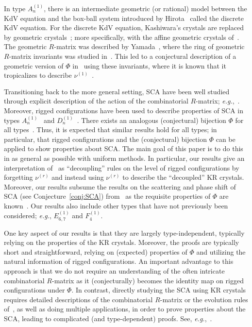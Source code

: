 \documentclass[reqno]{amsart}
\theoremstyle{plain}
\theoremstyle{definition}
\numberwithin{equation}{section}
\begin{document}
In type $A_n^{(1)}$, there is an intermediate geometric (or rational) model between the KdV equation and the box-ball system introduced by Hirota~\cite{Hirota81} called the discrete KdV equation.
For the discrete KdV equation, Kashiwara's crystals are replaced by geometric crystals~\cite{BK00, BK07}; more specifically, with the affine geometric crystals of~\cite{KNO08,LP12}.
The geometric $R$-matrix was described by Yamada~\cite{Yamada01}, where the ring of geometric $R$-matrix invariants was studied in~\cite{LP13}.
This led to a conjectural description of a geometric version of $\Phi$ in~\cite{LPS15, Scrimshaw17II} using these invariants, where it is known that it tropicalizes to describe $\nu^{(1)}$~\cite{LPS15}.

Transitioning back to the more general setting, SCA have been well studied through explicit description of the action of the combinatorial $R$-matrix; \textit{e.g.},~\cite{binMohamad12,FOY00,HHIKTT01,HKOTY02,HKT00,MOW12,MW13,TNS96,Yamada04,Yamada07}.
Moreover, rigged configurations have been used to describe properties of SCA in types $A_n^{(1)}$~\cite{KOSTY06,KSY07,Sakamoto08} and $D_n^{(1)}$~\cite{KSY11,Sakamoto17}.
There exists an analogous (conjectural) bijection $\Phi$ for all types~\cite{DS06, JS10, KSS02, OSSS16, OS12, OSS17, OSS03, OSS03III, OSS03II, SchillingS15, SS2006, SW10, Scrimshaw15, Scrimshaw17}.
Thus, it is expected that similar results hold for all types; in particular, that rigged configurations and the (conjectural) bijection $\Phi$ can be applied to show properties about SCA.
The main goal of this paper is to do this in as general as possible with uniform methods.
In particular, our results give an interpretation of~\cite[App.~B]{HKOTT02} as ``decoupling'' rules on the level of rigged configurations by forgetting $\nu^{(r)}$ and instead using $\nu^{(r)}$ to describe the ``decoupled'' KR crystals.
Moreover, our results subsume the results on the scattering and phase shift of SCA (see Conjecture~\ref{conj:SCA}) from~\cite{binMohamad12,FOY00,HHIKTT01,HKOTY02,HKT00,MOW12,MW13,TNS96,Yamada04,Yamada07} as the requisite properties of $\Phi$ are known~\cite{KSS02,OSSS16,OSS17,Scrimshaw17}.
Our results also include other types that have not previously been considered; \textit{e.g.}, $E_{6,7}^{(1)}$ and $F_4^{(1)}$.

One key aspect of our results is that they are largely type-independent, typically relying on the properties of the KR crystals.
Moreover, the proofs are typically short and straightforward, relying on (expected) properties of $\Phi$ and utilizing the natural information of rigged configurations.
An important advantage to this approach is that we do not require an understanding of the often intricate combinatorial $R$-matrix as it (conjecturally) becomes the identity map on rigged configurations under $\Phi$.
In contrast, directly studying the SCA using KR crystals requires detailed descriptions of the combinatorial $R$-matrix or the evolution rules of~\cite{HKT:2001}, as well as doing multiple applications, in order to prove properties about the SCA, leading to complicated (and type-dependent) proofs.
See, \textit{e.g.},~\cite{binMohamad12,FOY00,HHIKTT01,HKOTY02,HKT00,MOW12,MW13,TNS96,Yamada04,Yamada07}.
\end{document}
